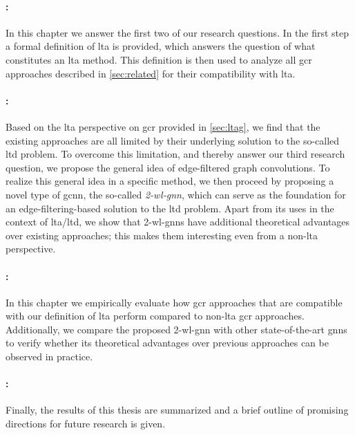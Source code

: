 \paragraph{: }
In this chapter we answer the first two of our research questions.
In the first step a formal definition of \ac{lta} is provided, which answers the question of what constitutes an \ac{lta} method.
This definition is then used to analyze all \ac{gcr} approaches described in \cref{sec:related} for their compatibility with \ac{lta}.

\paragraph{: }
Based on the \ac{lta} perspective on \ac{gcr} provided in \cref{sec:ltag}, we find that the existing approaches are all limited by their underlying solution to the so-called \ac*{ltd} problem.
To overcome this limitation, and thereby answer our third research question, we propose the general idea of edge-filtered graph convolutions.
To realize this general idea in a specific method, we then proceed by proposing a novel type of \ac*{gcnn}, the so-called \textit{2-\acs*{wl}-\acs{gnn}}, which can serve as the foundation for an edge-filtering-based solution to the \acs*{ltd} problem.
Apart from its uses in the context of \ac{lta}/\acs*{ltd}, we show that 2-\acs*{wl}-\acsp{gnn} have additional theoretical advantages over existing approaches;
this makes them interesting even from a non-\acs{lta} perspective.

\paragraph{: }
In this chapter we empirically evaluate how \ac{gcr} approaches that are compatible with our definition of \ac{lta} perform compared to non-\acs{lta} \ac{gcr} approaches.
Additionally, we compare the proposed 2-\acs*{wl}-\acs{gnn} with other state-of-the-art \acp{gnn} to verify whether its theoretical advantages over previous approaches can be observed in practice.

\paragraph{: }
Finally, the results of this thesis are summarized and a brief outline of promising directions for future research is given.
